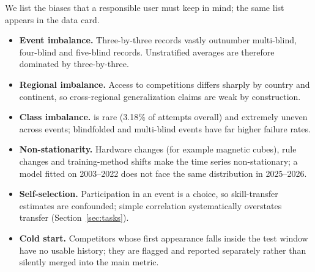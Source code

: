 We list the biases that a responsible user must keep in mind; the same list
appears in the data card.
\begin{itemize}
  \item \textbf{Event imbalance.} Three-by-three records vastly outnumber
        multi-blind, four-blind and five-blind records. Unstratified averages
        are therefore dominated by three-by-three.
  \item \textbf{Regional imbalance.} Access to competitions differs sharply by
        country and continent, so cross-regional generalization claims are
        weak by construction.
  \item \textbf{Class imbalance.} \DNF{} is rare (3.18\% of attempts overall)
        and extremely uneven across events; blindfolded and multi-blind events
        have far higher failure rates.
  \item \textbf{Non-stationarity.} Hardware changes (for example magnetic
        cubes), rule changes and training-method shifts make the time series
        non-stationary; a model fitted on 2003--2022 does not face the same
        distribution in 2025--2026.
  \item \textbf{Self-selection.} Participation in an event is a choice, so
        skill-transfer estimates are confounded; simple correlation
        systematically overstates transfer (Section~\ref{sec:tasks}).
  \item \textbf{Cold start.} Competitors whose first appearance falls inside
        the test window have no usable history; they are flagged and reported
        separately rather than silently merged into the main metric.
\end{itemize}

